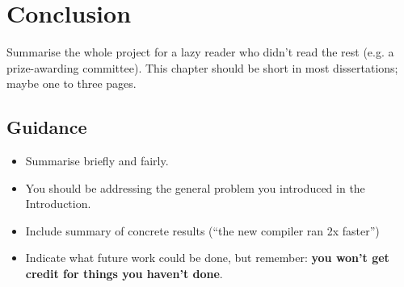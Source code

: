 \documentclass{l4proj}
\begin{document}







\chapter{Conclusion}    
Summarise the whole project for a lazy reader who didn't read the rest (e.g. a prize-awarding committee). This chapter should be short in most dissertations; maybe one to three pages.
\section{Guidance}
\begin{itemize}
    \item
        Summarise briefly and fairly.
    \item
        You should be addressing the general problem you introduced in the
        Introduction.        
    \item
        Include summary of concrete results (``the new compiler ran 2x
        faster'')
    \item
        Indicate what future work could be done, but remember: \textbf{you
        won't get credit for things you haven't done}.
\end{itemize}
\end{document}
